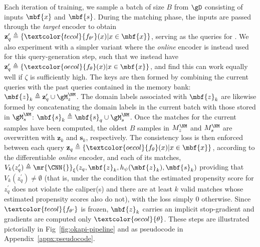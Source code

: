 Each iteration of training, we sample a batch of size $B$ from $\gD$ consisting of inputs $\mbf{x}$
and $\mbf{s}$.
%
During the matching phase, the inputs are passed through the \emph{target} encoder to obtain
$\mathbf{z}_q^\prime \triangleq \{ \textcolor{tecol}{f_{\theta^\prime} } (x) | x \in \mbf{x}\}$,
serving as the queries for \CNN{}.
%
We also experiment with a simpler variant where the \emph{online} encoder is instead used for this
query-generation step, such that we instead have $\mathbf{z}_q^\prime \triangleq
\{\textcolor{oecol}{f_{\theta}}(x) | x \in \mbf{x}\}$, and find this can work equally well if
$\zeta$ is sufficiently high.
%
The keys are then formed by combining the current queries with the past queries contained in the
memory bank: $\mbf{z}_k\triangleq \mathbf{z}_q^\prime \cup \gM^{\NM}_z$.
%
The domain labels associated with $\mbf{z}_k$ are likewise formed by concatenating the domain
labels in the current batch with those stored in $\gM^{\NM}_s$: $\mbf{s}_k \triangleq \mbf{s}_q \cup
\gM^{\NM}_s$.
%
Once the matches for the current samples have been computed, the oldest $B$ samples in $M^{\NM}_z$
and $M^{\NM}_s$ are overwritten with $\mathbf{z}_k$ and $\mathbf{s}_k$, respectively.
%
The consistency loss is then enforced between each query $\mathbf{z}_q \triangleq \{
  \textcolor{oecol}{f_{\theta}}(x) |
x \in \mbf{x}\} $, according to the differentiable \emph{online} encoder, and each of its matches,
$V_k(z_q^\prime) \triangleq \mr{\CNN{}}_\xi(z_q, \mbf{z}_k, h_\psi(\mbf{z}_k), \mbf{s}_k)$ providing
that $V_k(z_q^\prime) \neq \emptyset$ (that is, under the condition that the estimated propensity
score for $z_q^\prime$ does not violate the caliper(s) and there are at least $k$ valid matches
whose estimated propensity scores also do not), with the loss simply $0$ otherwise.
%
Since $\textcolor{tecol}{ f_{\theta^\prime} }$ is frozen, $\mbf{z}_k$ carries an implicit
stop-gradient and gradients are computed only \wrt{} $\textcolor{oecol}{ \theta}$.
%
These steps are illustrated pictorially in Fig~\ref{fig:okapi-pipeline} and as pseudocode in
Appendix~\ref{appx:pseudocode}.

